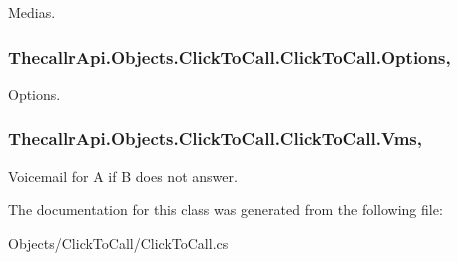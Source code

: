 Medias. 

\hypertarget{class_thecallr_api_1_1_objects_1_1_click_to_call_1_1_click_to_call_a870e36287a1dc95d3dd8da8da568f47e}{
\subsubsection[{Options}]{ Thecallr\+Api.\+Objects.\+Click\+To\+Call.\+Click\+To\+Call.\+Options\hspace{0.3cm}{\ttfamily [get]}, {\ttfamily [set]}}}\label{class_thecallr_api_1_1_objects_1_1_click_to_call_1_1_click_to_call_a870e36287a1dc95d3dd8da8da568f47e}


Options. 

\hypertarget{class_thecallr_api_1_1_objects_1_1_click_to_call_1_1_click_to_call_acd7e771b8815dfcad1bf20f9f2418e46}{
\subsubsection[{Vms}]{ Thecallr\+Api.\+Objects.\+Click\+To\+Call.\+Click\+To\+Call.\+Vms\hspace{0.3cm}{\ttfamily [get]}, {\ttfamily [set]}}}\label{class_thecallr_api_1_1_objects_1_1_click_to_call_1_1_click_to_call_acd7e771b8815dfcad1bf20f9f2418e46}


Voicemail for A if B does not answer. 



The documentation for this class was generated from the following file\+:\begin{DoxyCompactItemize}
\item 
Objects/\+Click\+To\+Call/Click\+To\+Call.\+cs\end{DoxyCompactItemize}
